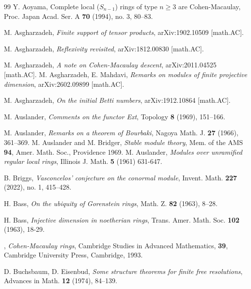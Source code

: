 \documentclass[10. pt,a4paper]{amsart}
\theoremstyle{definition}
\theoremstyle{remark}
\begin{document}
\maketitle
\begin{thebibliography}{99}
	Y. Aoyama,   Complete local ($S_{n-1}$) rings of type $n\geq 3$ are Cohen-Macaulay,  Proc. Japan Acad. Ser. A  {\bf{70}} (1994), no. 3, 80–83.
	
 M. Asgharzadeh,
 \emph{Finite support of tensor products}, arXiv:1902.10509   [math.AC].
 
 M. Asgharzadeh, \emph{Reflexivity revisited}, arXiv:1812.00830  [math.AC].
 
M. Asgharzadeh, \emph{A note on Cohen-Macaulay descent},  arXiv:2011.04525  [math.AC].
M. Asgharzadeh, E. Mahdavi,
 \emph{Remarks on modules of finite projective dimension}, arXiv:2602.09899 [math.AC].

M. Asgharzadeh, \emph{On the initial Betti numbers}, arXiv:1912.10864 [math.AC].

  M. Auslander, \emph{Comments on the functor Ext}, Topology {\bf{8}} (1969), 151--166.
 
  M. Auslander, \emph{
 	Remarks on a theorem of Bourbaki},
 	Nagoya Math. J. {\bf{27}} (1966), 361–369.
 	M. Auslander and M. Bridger, \emph{Stable module theory}, Mem. of
 	the AMS  {\bf94}, Amer. Math. Soc., Providence 1969.
  M.
 Auslander,  \emph{Modules over unramified regular local rings}, Illinois J. Math. {\bf{5}} (1961) 631-647.
 
B.  Briggs, \emph{Vasconcelos' conjecture on the conormal module}, Invent. Math. {\bf{227}} (2022), no. 1, 415–428.

H. Bass, \emph{On the ubiquity of Gorenstein rings},
Math. Z. {\bf{82}} (1963), 8--28.



H. Bass, \emph{Injective dimension in noetherian rings}, Trans. Amer. Math. Soc. {\bf{102}} (1963), 18-29. 

, {\it Cohen-Macaulay rings},  Cambridge Studies in Advanced Mathematics,
{\bf 39},
Cambridge University Press, Cambridge, 1993.

D.
Buchsbaum, D. Eisenbud,  \emph{Some structure theorems for finite free resolutions}, Advances in Math. {\bf12} (1974), 84–139.
 

\end{thebibliography}
\end{document}
